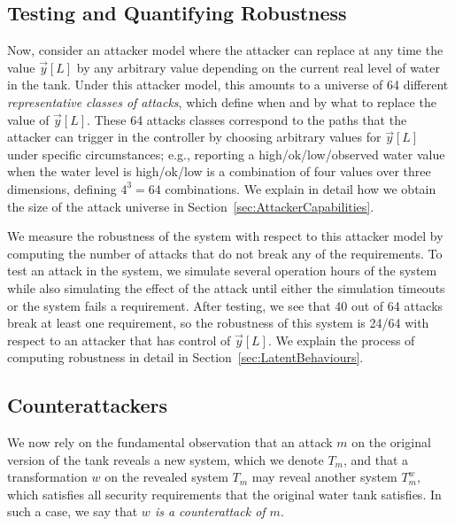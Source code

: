 \subsection*{Testing and Quantifying Robustness}
Now, consider an attacker model where the attacker can replace at any time the value $\vec{y}[L]$ by any arbitrary value depending on the current real level of water in the tank. 
Under this attacker model, this amounts to a universe of 64 different \emph{representative classes of attacks}, which define when and by what to replace the value of $\vec{y}[L]$. These 64 attacks classes correspond to the paths that the attacker can trigger in the controller by choosing arbitrary values for $\vec{y}[L]$ under specific circumstances; e.g., reporting a high/ok/low/observed water value when the water level is high/ok/low is a combination of four values over three dimensions, defining $4^3=64$ combinations. We explain in detail how we obtain the size of the attack universe in Section~\ref{sec:AttackerCapabilities}. 

We measure the robustness of the system with respect to this attacker model by computing the number of attacks that do not break any of the requirements. To test an attack in the system, we simulate several operation hours of the system while also simulating the effect of the attack until either the simulation timeouts or the system fails a requirement. After testing, we see that 40 out of 64 attacks break at least one requirement, so the robustness of this system is 24/64 with respect to an attacker that has control of $\vec{y}[L]$. We explain the process of computing robustness in detail in Section~\ref{sec:LatentBehaviours}.

\subsection*{Counterattackers}
We now rely on the fundamental observation that an attack $m$ on the original version of the tank reveals a new system, which we denote $T_m$, and that a transformation $w$ on the revealed system $T_m$ may reveal another system $T^w_m$, which satisfies all security requirements that the original water tank satisfies. In such a case, we say that \emph{$w$ is a counterattack of $m$}. 

